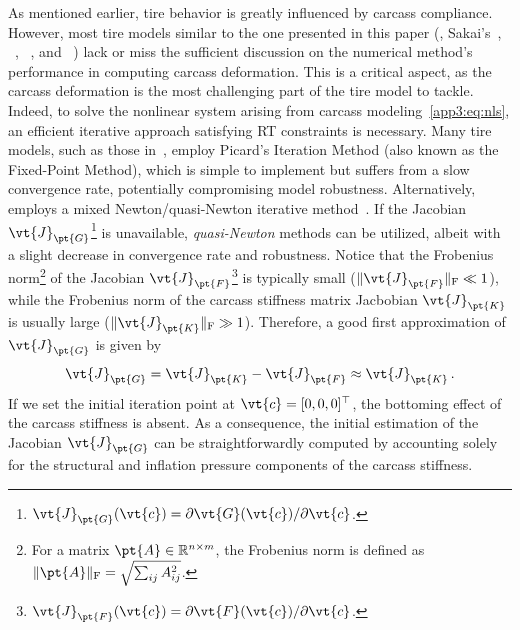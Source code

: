 As mentioned earlier, tire behavior is greatly influenced by carcass compliance. However, most tire models similar to the one presented in this paper (\ie{}, Sakai's~\cite{sakai1981theoreticalI, sakai1981theoreticalII, sakai1981theoreticalIII, sakai1982theoreticalIV}, \NeoFiala{}~\cite{miyashita2003analytical, miyashita2006new, kabe2006new, miyashita2015study, miyashita2010tire}, \TreadSim{}~\cite{dehoogh2005implementing}, and \TaMeTire{}~\cite{fevrier2013method}) lack or miss the sufficient discussion on the numerical method's performance in computing carcass deformation. This is a critical aspect, as the carcass deformation is the most challenging part of the tire model to tackle. Indeed, to solve the nonlinear system arising from carcass modeling~\eqref{app3:eq:nls}, an efficient iterative approach satisfying \ac{RT} constraints is necessary. Many tire models, such as those in~\cite{gruber2012normalI, gruber2012normalII, miyashita2010tire, miyashita2003analytical, miyashita2006new, kabe2006new, miyashita2015study}, employ Picard's Iteration Method (also known as the Fixed-Point Method), which is simple to implement but suffers from a slow convergence rate, potentially compromising model robustness. Alternatively, \TaMeTire{} employs a mixed Newton/quasi-Newton iterative method~\cite{fevrier2013method}. If the Jacobian $\vt{J}_\pt{G}$\footnote{$\vt{J}_\pt{G}(\vt{c}) = \partial\vt{G}(\vt{c})/\partial\vt{c}$.} is unavailable, \emph{quasi-Newton} methods can be utilized, albeit with a slight decrease in convergence rate and robustness. Notice that the Frobenius norm\footnote{For a matrix $\pt{A}\in\mathbb{R}^{n \times m}$, the Frobenius norm is defined as $\|\pt{A}\|_\mathrm{F}=\sqrt{\sum_{ij}A_{ij}^2}$.} of the Jacobian $\vt{J}_\pt{F}$\footnote{$\vt{J}_\pt{F}(\vt{c}) = \partial\vt{F}(\vt{c})/\partial\vt{c}$.} is typically small ($\|\vt{J}_\pt{F}\|_\mathrm{F} \ll 1$), while the Frobenius norm of the carcass stiffness matrix Jacbobian $\vt{J}_\pt{K}$ is usually large ($\|\vt{J}_\pt{K}\|_\mathrm{F} \gg 1$). Therefore, a good first approximation of $\vt{J}_\pt{G}$ is given by
%
\begin{equation*}
  \vt{J}_\pt{G} = \vt{J}_\pt{K} - \vt{J}_\pt{F} \approx \vt{J}_\pt{K} \, \text{.}
\end{equation*}
%
If we set the initial iteration point at $\vt{c} = [0,0,0]^\top$, the bottoming effect of the carcass stiffness is absent. As a consequence, the initial estimation of the Jacobian $\vt{J}_\pt{G}$ can be straightforwardly computed by accounting solely for the structural and inflation pressure components of the carcass stiffness.

